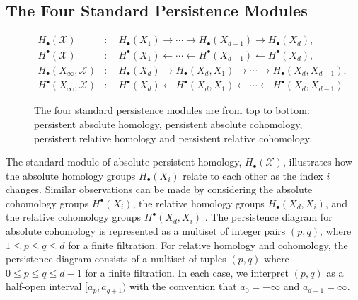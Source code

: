 \subsection{The Four Standard Persistence Modules}
\label{TheFourStandardPersistenceModules}
\begin{figure}[htb!]
	\begin{align*}
		H_{\bullet}(\mathcal{X})             & : \quad H_{\bullet}(X_{1}) \rightarrow \cdots \rightarrow H_{\bullet}(X_{d-1}) \rightarrow H_{\bullet}(X_{d}),             \\
		H^{\bullet}(\mathcal{X})             & : \quad H^{\bullet}(X_{1}) \leftarrow \cdots \leftarrow H^{\bullet}(X_{d-1}) \leftarrow H^{\bullet}(X_{d}),                \\
		H_{\bullet}(X_{\infty}, \mathcal{X}) & : \quad H_{\bullet}(X_{d}) \rightarrow H_{\bullet}(X_{d},X_{1}) \rightarrow \cdots \rightarrow H_{\bullet}(X_{d},X_{d-1}), \\
		H^{\bullet}(X_{\infty}, \mathcal{X}) & : \quad H^{\bullet}(X_{d}) \leftarrow H^{\bullet}(X_{d},X_{1}) \leftarrow \cdots \leftarrow H^{\bullet}(X_{d}, X_{d-1}).
	\end{align*}
	\caption{The four standard persistence modules are from top to bottom: persistent absolute homology, persistent absolute cohomology, persistent relative homology and persistent relative cohomology.}
\end{figure}
The standard module of absolute persistent homology, $H_{\bullet}(\mathcal{X})$, illustrates how the absolute homology groups
$H_{\bullet}(X_{i})$ relate to each other as the index $i$ changes. Similar observations
can be made by considering the absolute cohomology groups $H^{\bullet}(X_{i})$,
the relative homology groups $H_{\bullet}(X_{d}, X_{i})$, and the relative cohomology
groups $H^{\bullet}(X_{d}, X_{i})$ \cite[\S 2.4]{de2011dualities}. The persistence diagram for absolute cohomology is represented as a multiset of integer
pairs $(p,q)$, where $1 \leq p \leq q \leq d$ for a finite filtration. For relative
homology and cohomology, the persistence diagram consists of a multiset of
tuples $(p,q)$ where $0 \leq p \leq q \leq d-1$ for a finite filtration. In each
case, we interpret $(p,q)$ as a half-open interval $[a_{p}, a_{q+1})$ with the
convention that $a_{0} = -\infty$ and $a_{d+1} = \infty$.

